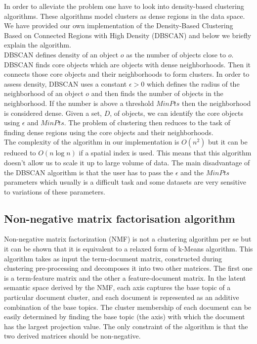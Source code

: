In order to alleviate the problem one have to look into density-based clustering algorithms. These algorithms model clusters as dense regions in the data space. We have provided our own implementation of the Density-Based Clustering Based on Connected Regions with High Density (DBSCAN) and below we briefly explain the algorithm. \\ 
DBSCAN defines density of an object $o$ as the number of objects close to $o$. DBSCAN finds core objects which are objects with dense neighborhoods. Then it connects those core objects and their neighborhoods to form clusters. In order to assess density, DBSCAN uses a constant $\epsilon  > 0$ which defines the radius of the neighborhood of an object $o$ and then finds the number of objects in the neighborhood. If the number is above a threshold $MinPts$ then the neighborhood is considered dense. Given a set, $D$, of objects, we can identify the core objects using $\epsilon$ and $MinPts$. The problem of clustering then reduces to the task of finding dense regions using the core objects and their neighborhoods. \\
The complexity of the algorithm in our implementation is $O(n^2)$ but it can be reduced to $O(n\log n)$ if a spatial index is used. This means that this algorithm doesn't allow us to scale it up to large volume of data. The main disadvantage of the DBSCAN algorithm is that the user has to pass the $\epsilon $ and the $MinPts$ parameters which usually is a difficult task and some datasets are very sensitive to variations of these parameters. 

\subsection{Non-negative matrix factorisation algorithm}
Non-negative matrix factorization (NMF) is not a clustering algorithm per se but it can be shown that it is equivalent to a relaxed form of k-Means algorithm. This algorithm takes as input the term-document matrix, constructed during clustering pre-processing and decomposes it into two other matrices. The first one is a term-feature matrix and the other a feature-document matrix. In the latent semantic space derived by the NMF, each axis captures the base topic of a particular document cluster, and each document is represented as an additive combination of the base topics. The cluster membership of each document can be easily determined by finding the base topic (the axis) with which the document has the largest projection value. The only constraint of the algorithm is that the two derived matrices should be non-negative. 

